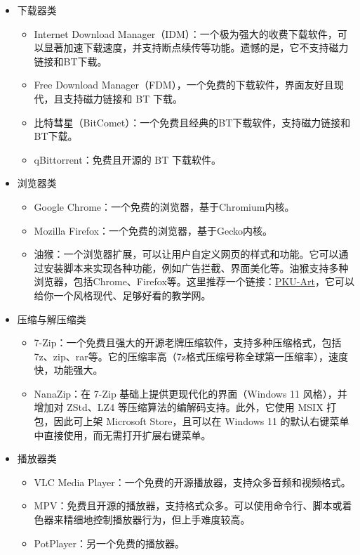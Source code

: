 \documentclass[../main.tex]{subfiles}
\begin{document}
\begin{itemize}
    \item 下载器类
    \begin{itemize}
        \item Internet Download Manager（IDM）：一个极为强大的收费下载软件，可以显著加速下载速度，并支持断点续传等功能。遗憾的是，它不支持磁力链接和BT下载。
        \item Free Download Manager（FDM），一个免费的下载软件，界面友好且现代，且支持磁力链接和 BT 下载。
        \item 比特彗星（BitComet）：一个免费且经典的BT下载软件，支持磁力链接和BT下载。
        \item qBittorrent：免费且开源的 BT 下载软件。
    \end{itemize}
    \item 浏览器类
    \begin{itemize}
        \item Google Chrome：一个免费的浏览器，基于Chromium内核。
        \item Mozilla Firefox：一个免费的浏览器，基于Gecko内核。
        \item 油猴：一个浏览器扩展，可以让用户自定义网页的样式和功能。它可以通过安装脚本来实现各种功能，例如广告拦截、界面美化等。油猴支持多种浏览器，包括Chrome、Firefox等。这里推荐一个链接：\href{https://github.com/zhuozhiyongde/PKU-Art}{PKU-Art}，它可以给你一个风格现代、足够好看的教学网。
    \end{itemize}
    \item 压缩与解压缩类
    \begin{itemize}
        \item 7-Zip：一个免费且强大的开源老牌压缩软件，支持多种压缩格式，包括7z、zip、rar等。它的压缩率高（7z格式压缩号称全球第一压缩率），速度快，功能强大。
        \item NanaZip：在 7-Zip 基础上提供更现代化的界面（Windows 11 风格），并增加对 ZStd、LZ4 等压缩算法的编解码支持。此外，它使用 MSIX 打包，因此可上架 Microsoft Store，且可以在 Windows 11 的默认右键菜单中直接使用，而无需打开扩展右键菜单。
    \end{itemize}
    \item 播放器类
    \begin{itemize}
        \item VLC Media Player：一个免费的开源播放器，支持众多音频和视频格式。
        \item MPV：免费且开源的播放器，支持格式众多。可以使用命令行、脚本或着色器来精细地控制播放器行为，但上手难度较高。
        \item PotPlayer：另一个免费的播放器。

\end{itemize}
\end{itemize}
\end{document}
